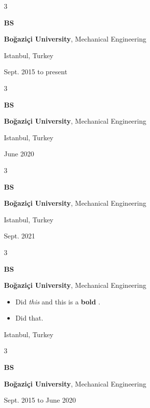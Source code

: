 \documentclass[10pt, letterpaper]{article}
\newenvironment{highlights}{
    \begin{itemize}[
        topsep=0.10 cm,
        parsep=0.10 cm,
        partopsep=0pt,
        itemsep=0pt,
        leftmargin=0.4 cm + 10pt
    ]
}{
    \end{itemize}
            
    \vspace{-0.10cm}
} %
\newenvironment{threecolentry}[3][]{
    \onecolentry
    \def\thirdColumn{#3}
    \setcolumnwidth{1cm, \fill, 4.1 cm}
    \begin{paracol}{3}
    \raggedright #2 \switchcolumn
}{
    \switchcolumn \raggedleft \thirdColumn
    \end{paracol}
    \endonecolentry
} %
\let\hrefWithoutArrow\href
\renewcommand{\href}[2]{\hrefWithoutArrow{#1}{\mbox{\ifthenelse{\equal{#2}{}}{ }{#2 }\raisebox{.15ex}{\footnotesize \faExternalLink*}}}}
\begin{document}
        \vspace{0.2 cm}

        \begin{threecolentry}{\textbf{BS}}{
            Istanbul, Turkey

        Sept. 2015 to present
        }
            \textbf{Boğaziçi University}, Mechanical Engineering
        \end{threecolentry}

        \vspace{0.2 cm}

        \begin{threecolentry}{\textbf{BS}}{
            Istanbul, Turkey

        June 2020
        }
            \textbf{Boğaziçi University}, Mechanical Engineering
        \end{threecolentry}

        \vspace{0.2 cm}

        \begin{threecolentry}{\textbf{BS}}{
            Istanbul, Turkey

        Sept. 2021
        }
            \textbf{Boğaziçi University}, Mechanical Engineering
        \end{threecolentry}

        \vspace{0.2 cm}

        \begin{threecolentry}{\textbf{BS}}{
            Istanbul, Turkey
        }
            \textbf{Boğaziçi University}, Mechanical Engineering
            \begin{highlights}
                \item Did \textit{this} and this is a \textbf{bold} \href{https://example.com}{link}.
                \item Did that.
            \end{highlights}
        \end{threecolentry}

        \vspace{0.2 cm}

        \begin{threecolentry}{\textbf{BS}}{
            Sept. 2015 to June 2020
        }
            \textbf{Boğaziçi University}, Mechanical Engineering
        \end{threecolentry}

        \vspace{0.2 cm}
\end{document}
